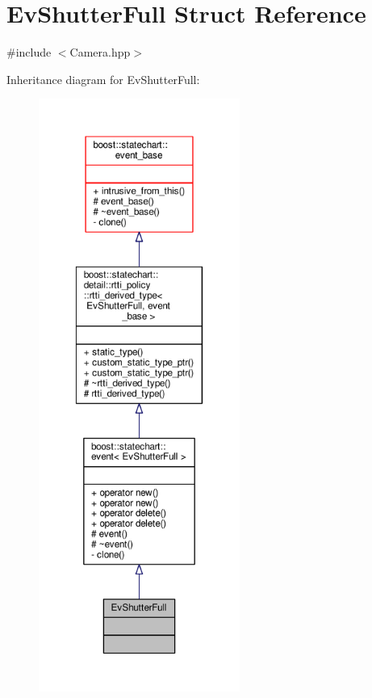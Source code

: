 \hypertarget{struct_ev_shutter_full}{}\section{Ev\+Shutter\+Full Struct Reference}
\label{struct_ev_shutter_full}


{\ttfamily \#include $<$Camera.\+hpp$>$}



Inheritance diagram for Ev\+Shutter\+Full\+:
\nopagebreak
\begin{figure}[H]
\begin{center}
\leavevmode
\includegraphics[height=550pt]{struct_ev_shutter_full__inherit__graph}
\end{center}
\end{figure}



